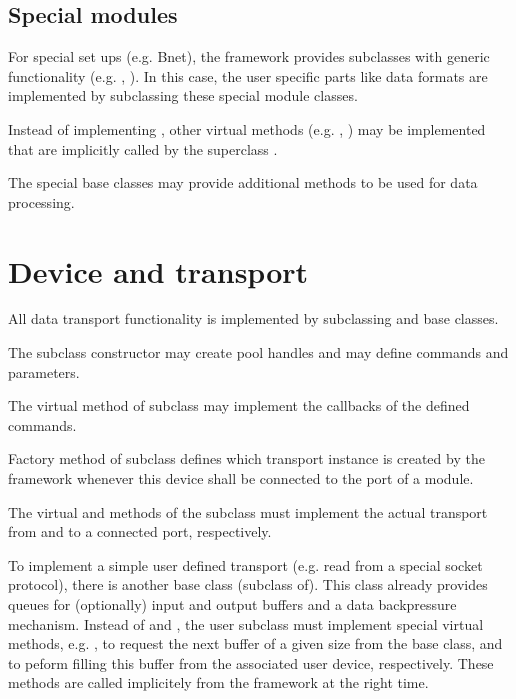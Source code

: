 \subsection{Special modules}
For special set ups (e.g. Bnet), the framework provides 
    subclasses with generic functionality 
   (e.g. , ). 
   In this case, the user specific parts like data formats are 
   implemented by subclassing these special module classes.

   
\begin{compactenum}

\item  Instead of implementing , other virtual 
      methods (e.g. , ) may be 
      implemented that are implicitly called by the superclass .
\item  The special base classes may provide additional 
      methods to be used for data processing.    
\end{compactenum}

\section{Device and transport}
All data transport functionality is implemented by 
   subclassing   and  base classes. 
\begin{compactenum}
\item  The  subclass constructor may create  
      pool handles and may define commands and parameters. 
\item  The virtual  method of  
      subclass may implement the callbacks of the defined commands.
\item  Factory method  of 
      subclass defines which transport instance is created 
      by the framework whenever this device shall be connected to 
      the port of a module.   
\item  The virtual  and  methods of the 
       subclass must implement the actual transport 
      from and to a connected port, respectively.
\item  To implement a simple user defined transport 
      (e.g. read from a special socket protocol), 
      there is another base class  
      (subclass of). 
      This class already provides queues for (optionally)
      input and output buffers and a data backpressure mechanism. 
      Instead of  and , the user subclass must implement 
      special virtual methods, e.g. ,  
      to request the next buffer of a given size from the base class, 
      and to peform filling this buffer from the associated user device, respectively. 
      These methods are called implicitely from the framework at the right time. 
\end{compactenum}

